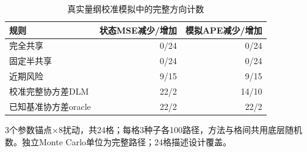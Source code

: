 \begin{table}[!htbp]\centering
\caption{真实量纲校准模拟中的完整方向计数}\label{tab:round2sim}
\small\setlength{\tabcolsep}{4pt}
\begin{tabularx}{\linewidth}{L r r}\toprule
规则 & 状态MSE减少/增加 & 模拟APE减少/增加 \\
\midrule
完全共享 & 0/24 & 0/24 \\
固定半共享 & 0/24 & 0/24 \\
近期风险 & 9/15 & 9/15 \\
校准完整协方差DLM & 22/2 & 14/10 \\
已知基准协方差oracle & 22/2 & 22/2 \\
\bottomrule\end{tabularx}
\par\vspace{3pt}\begin{minipage}{\linewidth}\footnotesize 3个参数锚点×8扰动，共24格；每格3种子各100路径，方法与格间共用底层随机数。独立Monte Carlo单位为完整路径；24格描述设计覆盖。\end{minipage}
\end{table}
